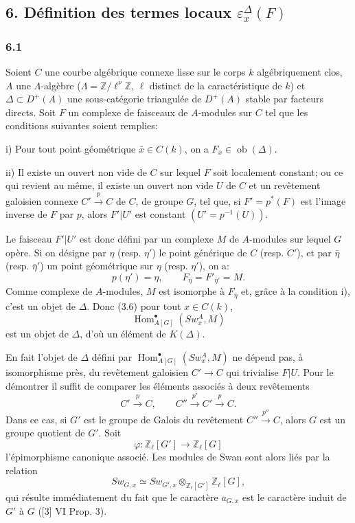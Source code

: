 \documentclass[11pt]{article}
\DeclareMathOperator{\Hom}{Hom}
\providecommand{\Ob}{\operatorname{ob}}
\providecommand{\Hom}{\operatorname{Hom}}
\providecommand{\Ob}{\operatorname{ob}}
\providecommand{\Ob}{\operatorname{Ob}}
\begin{document}
\subsection*{6. Définition des termes locaux $\varepsilon_x^\Delta(F)$}

\subsubsection*{6.1}

Soient $C$ une courbe algébrique connexe lisse sur le corps $k$ algébriquement clos, $A$ une $\Lambda$-algèbre ($\Lambda=\mathbb Z/\ell^\nu\mathbb Z$, $\ell$ distinct de la caractéristique de $k$) et $\Delta\subset D^+(A)$ une sous-catégorie triangulée de $D^+(A)$ stable par facteurs directs. Soit $F$ un complexe de faisceaux de $A$-modules sur $C$ tel que les conditions suivantes soient remplies:

i) Pour tout point géométrique $\bar x\in C(k)$, on a $F_{\bar x}\in\Ob(\Delta)$.

ii) Il existe un ouvert non vide de $C$ sur lequel $F$ soit localement constant; ou ce qui revient au même, il existe un ouvert non vide $U$ de $C$ et un revêtement galoisien connexe $C'\xrightarrow{p}C$ de $C$, de groupe $G$, tel que, si $F'=p^*(F)$ est l'image inverse de $F$ par $p$, alors $F'|U'$ est constant $(U'=p^{-1}(U))$.

Le faisceau $F'|U'$ est donc défini par un complexe $M$ de $A$-modules sur lequel $G$ opère. Si on désigne par $\eta$ (resp. $\eta'$) le point générique de $C$ (resp. $C'$), et par $\bar\eta$ (resp. $\bar\eta'$) un point géométrique sur $\eta$ (resp. $\eta'$), on a:
\[
p(\eta')=\eta,\qquad
F_{\bar\eta}=F'_{\bar\eta'}=M.
\tag{6.1.1}
\]
Comme complexe de $A$-modules, $M$ est isomorphe à $F_{\bar\eta}$ et, grâce à la condition i), c'est un objet de $\Delta$. Donc (3.6) pour tout $x\in C(k)$,
\[
\Hom^\bullet_{A[G]}(Sw_x^A,M)
\]
est un objet de $\Delta$, d'où un élément de $K(\Delta)$.

En fait l'objet de $\Delta$ défini par $\Hom^\bullet_{A[G]}(Sw_x^A,M)$ ne dépend pas, à isomorphisme près, du revêtement galoisien $C'\to C$ qui trivialise $F|U$. Pour le démontrer il suffit de comparer les éléments associés à deux revêtements
\[
C'\xrightarrow{p}C,\qquad C''\xrightarrow{p'}C'\xrightarrow{p}C.
\]
Dans ce cas, si $G'$ est le groupe de Galois du revêtement $C''\xrightarrow{p''}C$, alors $G$ est un groupe quotient de $G'$. Soit
\[
\varphi:\mathbb Z_\ell[G']\longrightarrow \mathbb Z_\ell[G]
\]
l'épimorphisme canonique associé. Les modules de Swan sont alors liés par la relation
\[
Sw_{G,x}\simeq Sw_{G',x}\otimes_{\mathbb Z_\ell[G']}\mathbb Z_\ell[G],
\]
qui résulte immédiatement du fait que le caractère $a_{G,x}$ est le caractère induit de $G'$ à $G$ ([3] VI Prop. 3).
\end{document}
